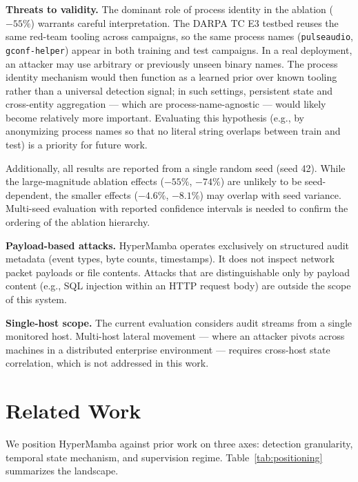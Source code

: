 \documentclass[letterpaper,twocolumn,10pt]{article}
\begin{document}
\textbf{Threats to validity.} The dominant role of process identity in the ablation ($-55\%$) warrants careful interpretation. The DARPA TC E3 testbed reuses the same red-team tooling across campaigns, so the same process names (\texttt{pulseaudio}, \texttt{gconf-helper}) appear in both training and test campaigns. In a real deployment, an attacker may use arbitrary or previously unseen binary names. The process identity mechanism would then function as a learned prior over known tooling rather than a universal detection signal; in such settings, persistent state and cross-entity aggregation --- which are process-name-agnostic --- would likely become relatively more important. Evaluating this hypothesis (e.g., by anonymizing process names so that no literal string overlaps between train and test) is a priority for future work.

Additionally, all results are reported from a single random seed (seed 42). While the large-magnitude ablation effects ($-55\%$, $-74\%$) are unlikely to be seed-dependent, the smaller effects ($-4.6\%$, $-8.1\%$) may overlap with seed variance. Multi-seed evaluation with reported confidence intervals is needed to confirm the ordering of the ablation hierarchy.

\textbf{Payload-based attacks.} HyperMamba operates exclusively on structured audit metadata (event types, byte counts, timestamps). It does not inspect network packet payloads or file contents. Attacks that are distinguishable only by payload content (e.g., SQL injection within an HTTP request body) are outside the scope of this system.

\textbf{Single-host scope.} The current evaluation considers audit streams from a single monitored host. Multi-host lateral movement --- where an attacker pivots across machines in a distributed enterprise environment --- requires cross-host state correlation, which is not addressed in this work.

\section{Related Work}
\label{sec:related_work}

We position HyperMamba against prior work on three axes: detection granularity, temporal state mechanism, and supervision regime. Table~\ref{tab:positioning} summarizes the landscape.
\end{document}
